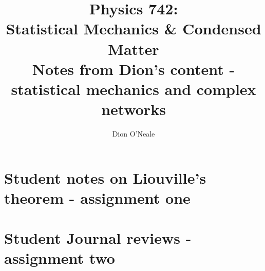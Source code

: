 \documentclass[final]{article}
\begin{document}
\newcommand{\calG}{\mathcal{G}}
\title{Physics 742: \\
	Statistical Mechanics \& Condensed Matter\\
	Notes from Dion's content - statistical mechanics and complex networks}
\author{Dion O'Neale}
\maketitle
\newpage
\tableofcontents
\newpage










\section{Student notes on Liouville's theorem - assignment one}








\section{Student Journal reviews - assignment two}







\end{document}
